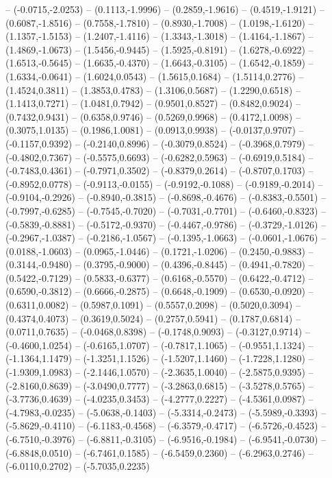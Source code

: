 {	-- (-0.0715,-2.0253)
	-- (0.1113,-1.9996)
	-- (0.2859,-1.9616)
	-- (0.4519,-1.9121)
	-- (0.6087,-1.8516)
	-- (0.7558,-1.7810)
	-- (0.8930,-1.7008)
	-- (1.0198,-1.6120)
	-- (1.1357,-1.5153)
	-- (1.2407,-1.4116)
	-- (1.3343,-1.3018)
	-- (1.4164,-1.1867)
	-- (1.4869,-1.0673)
	-- (1.5456,-0.9445)
	-- (1.5925,-0.8191)
	-- (1.6278,-0.6922)
	-- (1.6513,-0.5645)
	-- (1.6635,-0.4370)
	-- (1.6643,-0.3105)
	-- (1.6542,-0.1859)
	-- (1.6334,-0.0641)
	-- (1.6024,0.0543)
	-- (1.5615,0.1684)
	-- (1.5114,0.2776)
	-- (1.4524,0.3811)
	-- (1.3853,0.4783)
	-- (1.3106,0.5687)
	-- (1.2290,0.6518)
	-- (1.1413,0.7271)
	-- (1.0481,0.7942)
	-- (0.9501,0.8527)
	-- (0.8482,0.9024)
	-- (0.7432,0.9431)
	-- (0.6358,0.9746)
	-- (0.5269,0.9968)
	-- (0.4172,1.0098)
	-- (0.3075,1.0135)
	-- (0.1986,1.0081)
	-- (0.0913,0.9938)
	-- (-0.0137,0.9707)
	-- (-0.1157,0.9392)
	-- (-0.2140,0.8996)
	-- (-0.3079,0.8524)
	-- (-0.3968,0.7979)
	-- (-0.4802,0.7367)
	-- (-0.5575,0.6693)
	-- (-0.6282,0.5963)
	-- (-0.6919,0.5184)
	-- (-0.7483,0.4361)
	-- (-0.7971,0.3502)
	-- (-0.8379,0.2614)
	-- (-0.8707,0.1703)
	-- (-0.8952,0.0778)
	-- (-0.9113,-0.0155)
	-- (-0.9192,-0.1088)
	-- (-0.9189,-0.2014)
	-- (-0.9104,-0.2926)
	-- (-0.8940,-0.3815)
	-- (-0.8698,-0.4676)
	-- (-0.8383,-0.5501)
	-- (-0.7997,-0.6285)
	-- (-0.7545,-0.7020)
	-- (-0.7031,-0.7701)
	-- (-0.6460,-0.8323)
	-- (-0.5839,-0.8881)
	-- (-0.5172,-0.9370)
	-- (-0.4467,-0.9786)
	-- (-0.3729,-1.0126)
	-- (-0.2967,-1.0387)
	-- (-0.2186,-1.0567)
	-- (-0.1395,-1.0663)
	-- (-0.0601,-1.0676)
	-- (0.0188,-1.0603)
	-- (0.0965,-1.0446)
	-- (0.1721,-1.0206)
	-- (0.2450,-0.9883)
	-- (0.3144,-0.9480)
	-- (0.3795,-0.9000)
	-- (0.4396,-0.8445)
	-- (0.4941,-0.7820)
	-- (0.5422,-0.7129)
	-- (0.5833,-0.6377)
	-- (0.6168,-0.5570)
	-- (0.6422,-0.4712)
	-- (0.6590,-0.3812)
	-- (0.6666,-0.2875)
	-- (0.6648,-0.1909)
	-- (0.6530,-0.0920)
	-- (0.6311,0.0082)
	-- (0.5987,0.1091)
	-- (0.5557,0.2098)
	-- (0.5020,0.3094)
	-- (0.4374,0.4073)
	-- (0.3619,0.5024)
	-- (0.2757,0.5941)
	-- (0.1787,0.6814)
	-- (0.0711,0.7635)
	-- (-0.0468,0.8398)
	-- (-0.1748,0.9093)
	-- (-0.3127,0.9714)
	-- (-0.4600,1.0254)
	-- (-0.6165,1.0707)
	-- (-0.7817,1.1065)
	-- (-0.9551,1.1324)
	-- (-1.1364,1.1479)
	-- (-1.3251,1.1526)
	-- (-1.5207,1.1460)
	-- (-1.7228,1.1280)
	-- (-1.9309,1.0983)
	-- (-2.1446,1.0570)
	-- (-2.3635,1.0040)
	-- (-2.5875,0.9395)
	-- (-2.8160,0.8639)
	-- (-3.0490,0.7777)
	-- (-3.2863,0.6815)
	-- (-3.5278,0.5765)
	-- (-3.7736,0.4639)
	-- (-4.0235,0.3453)
	-- (-4.2777,0.2227)
	-- (-4.5361,0.0987)
	-- (-4.7983,-0.0235)
	-- (-5.0638,-0.1403)
	-- (-5.3314,-0.2473)
	-- (-5.5989,-0.3393)
	-- (-5.8629,-0.4110)
	-- (-6.1183,-0.4568)
	-- (-6.3579,-0.4717)
	-- (-6.5726,-0.4523)
	-- (-6.7510,-0.3976)
	-- (-6.8811,-0.3105)
	-- (-6.9516,-0.1984)
	-- (-6.9541,-0.0730)
	-- (-6.8848,0.0510)
	-- (-6.7461,0.1585)
	-- (-6.5459,0.2360)
	-- (-6.2963,0.2746)
	-- (-6.0110,0.2702)
	-- (-5.7035,0.2235)
}
